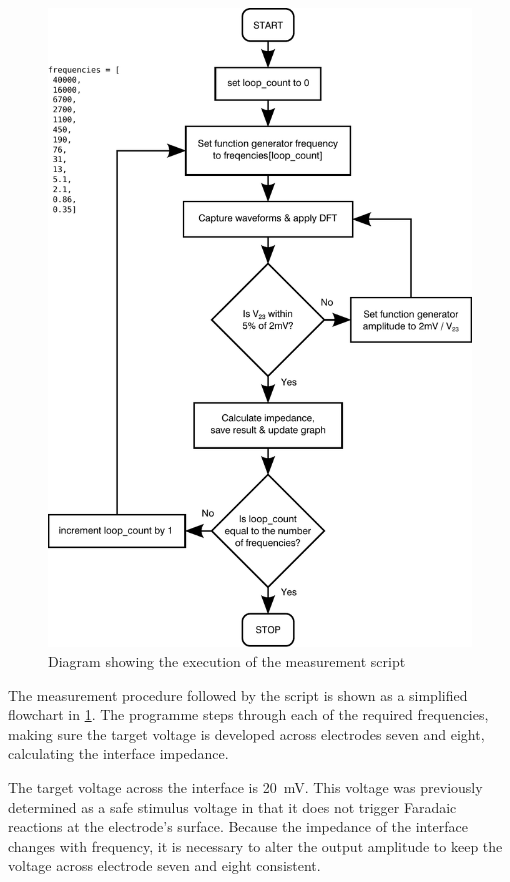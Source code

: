 \begin{figure}
    \centering
    \includegraphics[width=\textwidth]{content/pt2/graphics/measurementFlowchart}
    \caption{\label{fig:creatingCSF_pythonFlowchart}Diagram showing the execution of the measurement script}
\end{figure}

The measurement procedure followed by the script is shown as a simplified flowchart in \cref{fig:creatingCSF_pythonFlowchart}.
The programme steps through each of the required frequencies, making sure the target voltage is developed across electrodes seven and eight, calculating the interface impedance.

The target voltage across the interface is \SI{20}{\milli\volt}.
This voltage was previously determined as a safe stimulus voltage in that it does not trigger Faradaic reactions at the electrode's surface.
Because the impedance of the interface changes with frequency, it is necessary to alter the output amplitude to keep the voltage across electrode seven and eight consistent.

